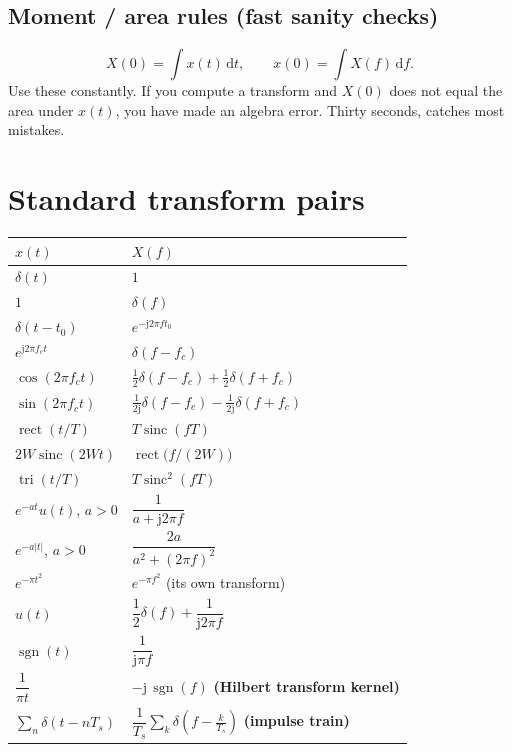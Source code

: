 \documentclass[11pt,a4paper]{article}
\newcommand{\sinc}{\operatorname{sinc}}
\newcommand{\rect}{\operatorname{rect}}
\newcommand{\tri}{\operatorname{tri}}
\newcommand{\sgn}{\operatorname{sgn}}
\newcommand{\dd}{\,\mathrm{d}}
\newcommand{\ii}{\mathrm{j}}
\begin{document}
\subsection{Moment / area rules (fast sanity checks)}
\[
X(0)=\int x(t)\dd t,
\qquad
x(0)=\int X(f)\dd f .
\]
Use these constantly. If you compute a transform and $X(0)$ does not equal the area under $x(t)$, you have
made an algebra error. Thirty seconds, catches most mistakes.

\section{Standard transform pairs}

\begin{center}
\renewcommand{\arraystretch}{1.7}
\begin{tabular}{@{}p{6.6cm}p{6.6cm}@{}}
\toprule
\textbf{$x(t)$} & \textbf{$X(f)$}\\
\midrule
$\delta(t)$ & $1$\\
$1$ & $\delta(f)$\\
$\delta(t-t_0)$ & $e^{-\ii2\pi ft_0}$\\
$e^{\ii2\pi f_ct}$ & $\delta(f-f_c)$\\
$\cos(2\pi f_ct)$ & $\tfrac12\delta(f-f_c)+\tfrac12\delta(f+f_c)$\\
$\sin(2\pi f_ct)$ & $\tfrac{1}{2\ii}\delta(f-f_c)-\tfrac{1}{2\ii}\delta(f+f_c)$\\
$\rect(t/T)$ & $T\sinc(fT)$\\
$2W\sinc(2Wt)$ & $\rect\!\big(f/(2W)\big)$\\
$\tri(t/T)$ & $T\sinc^2(fT)$\\
$e^{-at}u(t)$, $a>0$ & $\dfrac{1}{a+\ii2\pi f}$\\
$e^{-a|t|}$, $a>0$ & $\dfrac{2a}{a^2+(2\pi f)^2}$\\
$e^{-\pi t^2}$ & $e^{-\pi f^2}$ \quad (its own transform)\\
$u(t)$ & $\dfrac{1}{2}\delta(f)+\dfrac{1}{\ii2\pi f}$\\
$\sgn(t)$ & $\dfrac{1}{\ii\pi f}$\\
$\dfrac{1}{\pi t}$ & $-\ii\,\sgn(f)$ \quad \textbf{(Hilbert transform kernel)}\\
$\displaystyle\sum_{n}\delta(t-nT_s)$ & $\dfrac{1}{T_s}\displaystyle\sum_{k}\delta\!\left(f-\tfrac{k}{T_s}\right)$ \quad \textbf{(impulse train)}\\
\bottomrule
\end{tabular}
\end{center}
\end{document}
